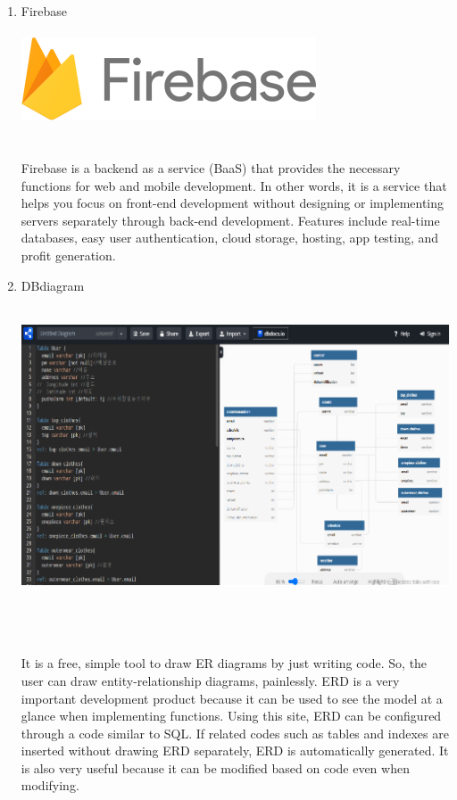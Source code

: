 \documentclass[conference]{IEEEtran}
\begin{document}
\begin{enumerate}
    \item Firebase \\ \\
    \includegraphics[scale=0.7]{assets/firebase.png}
    \\ \\ \\ Firebase is a backend as a service (BaaS) that provides the necessary functions for web and mobile development. In other words, it is a service that helps you focus on front-end development without designing or implementing servers separately through back-end development. Features include real-time databases, easy user authentication, cloud storage, hosting, app testing, and profit generation.  

\break   

    \item DBdiagram \\ \\
    \centerline{\includegraphics[scale=0.8]{assets/DB.png}}
    \\ \\ \\ It is a free, simple tool to draw ER diagrams by just writing code. So, the user can draw entity-relationship diagrams, painlessly. ERD is a very important development product because it can be used to see the model at a glance when implementing functions. Using this site, ERD can be configured through a code similar to SQL. If related codes such as tables and indexes are inserted without drawing ERD separately, ERD is automatically generated. It is also very useful because it can be modified based on code even when modifying.\\ \\ \\ \\ \\ \\


\end{enumerate}
\end{document}
